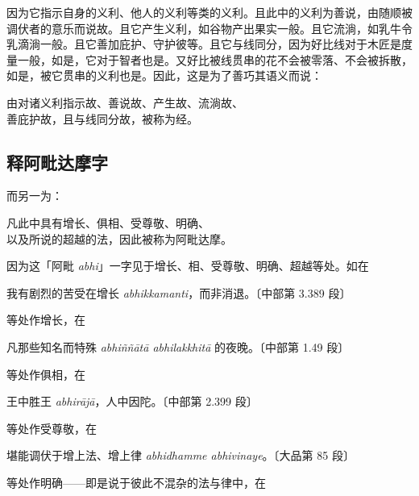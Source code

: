 因为它指示自身的义利、他人的义利等类的义利。且此中的义利为善说，由随顺被调伏者的意乐而说故。且它产生义利，如谷物产出果实一般。且它流淌，如乳牛令乳滴淌一般。且它善加庇护、守护彼等。且它与线同分，因为好比线对于木匠是度量一般，如是，它对于智者也是。又好比被线贯串的花不会被零落、不会被拆散，如是，被它贯串的义利也是。因此，这是为了善巧其语义而说：

\begin{quoting}由对诸义利指示故、善说故、产生故、流淌故、\\善庇护故，且与线同分故，被称为经。\end{quoting}

\subsection*{释阿毗达摩字}

而另一为：

\begin{quoting}凡此中具有增长、俱相、受尊敬、明确、\\以及所说的超越的法，因此被称为阿毗达摩。\end{quoting}

因为这「阿毗 {\footnotesize \textit{abhi}}」一字见于增长、相、受尊敬、明确、超越等处。如在

\begin{quoting}我有剧烈的苦受在增长 {\footnotesize \textit{abhikkamanti}}，而非消退。{\bluefootnotesize 〔中部第 3.389 段〕}\end{quoting}

等处作增长，在

\begin{quoting}凡那些知名而特殊 {\footnotesize \textit{abhiññātā abhilakkhitā}} 的夜晚。{\bluefootnotesize 〔中部第 1.49 段〕}\end{quoting}

等处作俱相，在

\begin{quoting}王中胜王 {\footnotesize \textit{abhirājā}}，人中因陀。{\bluefootnotesize 〔中部第 2.399 段〕}\end{quoting}

等处作受尊敬，在

\begin{quoting}堪能调伏于增上法、增上律 {\footnotesize \textit{abhidhamme abhivinaye}}。{\bluefootnotesize 〔大品第 85 段〕}\end{quoting}

等处作明确——即是说于彼此不混杂的法与律中，在

